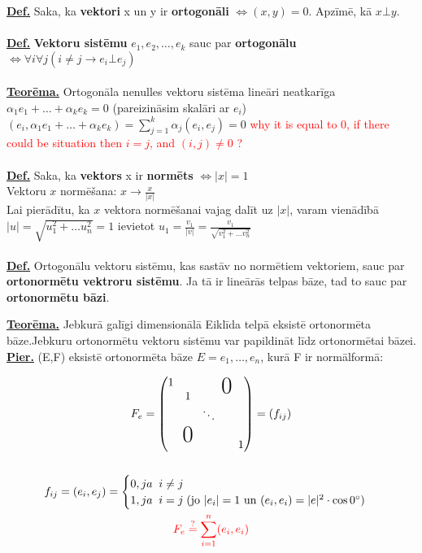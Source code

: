 \documentclass[12pt]{article}
\begin{document}
\textbf{\underline{Def.}} Saka, ka  \textbf{vektori} x un y ir \textbf{ortogonāli} $\Leftrightarrow (x,y) = 0$. Apzīmē, kā $ x \bot y$.
\\ \\
\textbf{\underline{Def.}}   \textbf{Vektoru sistēmu} $e_1, e_2, \ldots, e_k$ sauc par \textbf{ortogonālu}   
	$\Leftrightarrow  \forall i \forall j (i \neq j  \rightarrow e_i  \bot e_j)$
\\ \\
\textbf{\underline{Teorēma.}} Ortogonāla nenulles vektoru sistēma lineāri neatkarīga \\
	$\alpha_1e_1 + \ldots + \alpha_ke_k = 0$ (pareizināsim skalāri ar $e_i$) \\
	$(e_i, \alpha_1e_1 + \ldots + \alpha_ke_k) = \sum_{j=1}^{k}\alpha_j(e_i,e_j) = 0$
	\textcolor{red}{why it is equal to 0, if there could be situation then $i = j$, and $(i,j) \neq 0$ ?}
\\ \\
\textbf{\underline{Def.}} Saka, ka \textbf{vektors} x ir \textbf{normēts}  $\Leftrightarrow |x| = 1 $ \\
	Vektoru $x$ normēšana:  $ x \rightarrow \frac{x}{|x|} $ \\ 
	Lai pierādītu, ka $x$ vektora normēšanai vajag dalīt uz $|x|$, varam vienādībā
	$|u| = \sqrt{u_1^2 + \ldots u_n^2} = 1$ ievietot $u_1 = \frac{v_1}{|v|} = \frac{v_1}{ \sqrt{v_1^2 + \ldots v_n^2}}$
\\ \\
\textbf{\underline{Def.}} Ortogonālu vektoru sistēmu,  kas sastāv no normētiem vektoriem, sauc par \textbf{ortonormētu vektroru sistēmu}. Ja tā ir lineārās telpas bāze, tad to sauc par \textbf{ortonormētu bāzi}. 

\pagebreak 

\textbf{\underline{Teorēma.}} Jebkurā galīgi dimensionālā Eiklīda telpā eksistē ortonormēta bāze.Jebkuru ortonormētu vektoru sistēmu var papildināt līdz ortonormētai bāzei. \\

\textbf{\underline{Pier.}}  (E,F) eksistē ortonormēta bāze $E = e_1, \ldots, e_n$, kurā  F ir normālformā: 

\begin{gather*}
	F_e = 
	\begin{pmatrix}
	1 & && \bigzero   \\ 
    	& 1 &  \\
	& &  \ddots  &\\ 
        & \bigzero  &  \\
    	& &  & &  1  \\ 	
    \end{pmatrix}
    = (f_{ij}) \\ \\ 
    f_{ij} = (e_i, e_j) = 
    \begin{cases}
	0, ja \; \;  i \neq j \\
	1, ja \; \; i = j  \; (\text{jo } |e_i| = 1 \text{ un } (e_i, e_i) = |e|^2 \cdot \cos 0^\circ)
     \end{cases}
     \\
     \color{red}{F_e \stackrel{?}{=} \sum^n_{i = 1} (e_i, e_i)}
\end{gather*}
\end{document}
